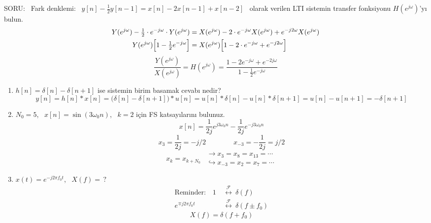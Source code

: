 \documentclass[11pt,a4paper]{article}
\begin{document}
{\color{kirmizikalem}SORU:} \ Fark denklemi: \ $y[n]-\frac12y[n-1]=x[n]-2x[n-1]+x[n-2]$ \ olarak verilen LTI sistemin transfer fonksiyonu $H(e^{j\omega})$'yı bulun.
\begin{align*}
  Y(e^{j\omega})-\tfrac12\cdot e^{-j\omega}\cdot Y(e^{j\omega})&=X(e^{j\omega})-2\cdot e^{-j\omega}X(e^{j\omega})+e^{-j2\omega}X(e^{j\omega})\\
  Y(e^{j\omega})\Bigl[1-\tfrac12e^{-j\omega}\Bigr]&=X(e^{j\omega})\Bigl[1-2\cdot e^{-j\omega}+e^{-j2\omega}\Bigr]
\end{align*}
\[
  \frac{Y(e^{j\omega})}{X(e^{j\omega})}=H(e^{j\omega})=\frac{1-2e^{-j\omega}+e^{-2j\omega}}{1-\frac12e^{-j\omega}}
\]

\begin{enumerate}[label=\arabic*)]
  \item $h[n]=\delta[n]-\delta[n+1]$ ise sistemin birim basamak cevabı nedir?
    \[
      y[n]=h[n]*x[n]=\bigl(\delta[n]-\delta[n+1]\bigr)*u[n]=u[n]*\delta[n]-u[n]*\delta[n+1]=u[n]-u[n+1]=-\delta[n+1]
    \]
  \item $N_0=5$, \ $x[n]=\sin(3\omega_0n)$, \ $k=2$ için FS katsayılarını bulunuz.
    \[ x[n]=\frac{1}{2j}e^{j3\omega_0n}-\frac{1}{2j}e^{-j3\omega_0n} \]
    \[ x_3=\frac{1}{2j}=-j/2\qquad\qquad x_{-3}=-\frac{1}{2j}=j/2 \]
    \[
      x_k=x_{k+N_0}\ \
      \begin{array}{l}
        \longrightarrow x_3=x_8=x_{13}=\cdots\\
        \hookrightarrow x_{-3}=x_2=x_7=\cdots
      \end{array}
    \]
  \item $x(t)=e^{-j2\pi f_0t}$, \ $X(f)=\,?$
    \begin{align*}
      \text{Reminder:}\quad 1\ &\overset{\mathcal{F}}{\longleftrightarrow}\ \delta(f)\\
      e^{\mp j2\pi f_0t}\ &\overset{\mathcal{F}}{\longleftrightarrow}\ \delta(f\pm f_0)
    \end{align*}
    \[ X(f)=\delta(f+f_0) \]
\end{enumerate}
\end{document}
